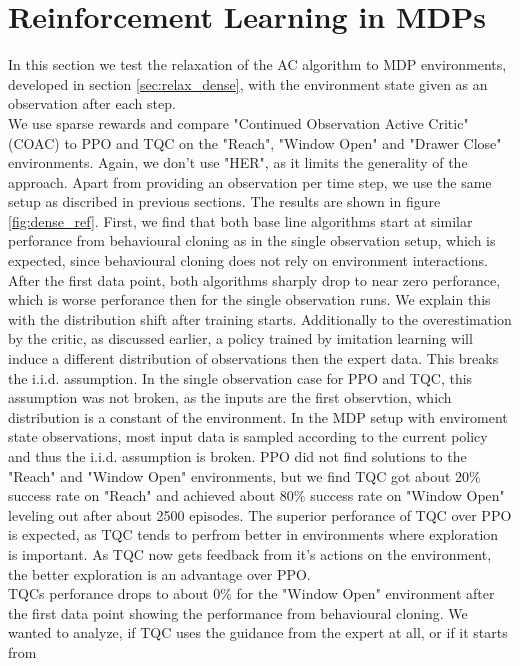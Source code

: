\section{Reinforcement Learning in MDPs}
\label{sec:DO_exp}
In this section we test the relaxation of the AC algorithm to MDP environments, developed in section \ref{sec:relax_dense}, with the environment state given as an observation after each step. \\
We use sparse rewards 
and compare "Continued Observation Active Critic" (COAC) to PPO and TQC on the "Reach", "Window Open" and "Drawer Close" environments. Again, we don't use "HER", as it limits the generality of 
the approach. Apart from 
providing an observation per time step,
we use the same setup as discribed in previous sections. The results are shown in figure \ref{fig:dense_ref}. First, we find that both base line algorithms 
start at similar perforance from behavioural cloning as in the single observation setup, which is expected, since behavioural cloning does not rely on 
environment interactions. After the first data point, both algorithms sharply drop to near zero perforance, which is worse perforance then for the single 
observation runs. We explain this with the distribution shift after training starts. Additionally to the overestimation by the critic, as discussed earlier, a policy trained by imitation learning 
will induce a different distribution of observations then the expert data. This breaks the i.i.d. assumption. In the single observation case for PPO and TQC, this assumption was not broken, 
as the inputs are the first observtion, which distribution is a constant of the environment. In the MDP setup with enviroment state observations, most input data is 
sampled according to the current policy and thus the i.i.d. assumption is broken. PPO did not find solutions to the "Reach" and "Window Open" environments, 
but we find TQC got about $20 \%$ success rate on "Reach" and achieved about $80 \%$ success rate on "Window Open" leveling out after about 2500 episodes. 
The superior perforance of TQC over PPO is expected, as TQC tends to perfrom better in environments where exploration is important. As TQC now gets 
feedback from it's actions on the environment, the better exploration is an advantage over PPO.\\ 
TQCs perforance drops to about $0 \%$ for the "Window Open" 
environment after the first data point showing the performance from behavioural cloning. We wanted to analyze, if TQC uses the guidance from the expert at all, or if it starts from 
